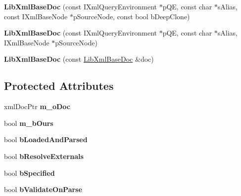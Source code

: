 \begin{DoxyCompactItemize}
\item 
\hypertarget{classgeneral__server_1_1LibXmlBaseDoc_a7a0b66f1564a53967b3620b5c8a22bfc}{{\bfseries \-Lib\-Xml\-Base\-Doc} (const \-I\-Xml\-Query\-Environment $\ast$p\-Q\-E, const char $\ast$s\-Alias, const \-I\-Xml\-Base\-Node $\ast$p\-Source\-Node, const bool b\-Deep\-Clone)}\label{classgeneral__server_1_1LibXmlBaseDoc_a7a0b66f1564a53967b3620b5c8a22bfc}

\item 
\hypertarget{classgeneral__server_1_1LibXmlBaseDoc_af5a822033de655d7ab04bdb86affcde9}{{\bfseries \-Lib\-Xml\-Base\-Doc} (const \-I\-Xml\-Query\-Environment $\ast$p\-Q\-E, const char $\ast$s\-Alias, \-I\-Xml\-Base\-Node $\ast$p\-Source\-Node)}\label{classgeneral__server_1_1LibXmlBaseDoc_af5a822033de655d7ab04bdb86affcde9}

\item 
\hypertarget{classgeneral__server_1_1LibXmlBaseDoc_a77c0d53cc2ae4f807591a61470c4d4c7}{{\bfseries \-Lib\-Xml\-Base\-Doc} (const \hyperlink{classgeneral__server_1_1LibXmlBaseDoc}{\-Lib\-Xml\-Base\-Doc} \&doc)}\label{classgeneral__server_1_1LibXmlBaseDoc_a77c0d53cc2ae4f807591a61470c4d4c7}

\end{DoxyCompactItemize}
\subsection*{\-Protected \-Attributes}
\begin{DoxyCompactItemize}
\item 
\hypertarget{classgeneral__server_1_1LibXmlBaseDoc_a2eafa7925bef59043e7a1022373a93da}{xml\-Doc\-Ptr {\bfseries m\-\_\-o\-Doc}}\label{classgeneral__server_1_1LibXmlBaseDoc_a2eafa7925bef59043e7a1022373a93da}

\item 
\hypertarget{classgeneral__server_1_1LibXmlBaseDoc_ad37961a7e05474336df7f6bdd02e4114}{bool {\bfseries m\-\_\-b\-Ours}}\label{classgeneral__server_1_1LibXmlBaseDoc_ad37961a7e05474336df7f6bdd02e4114}

\item 
\hypertarget{classgeneral__server_1_1LibXmlBaseDoc_ad9a64a817392bbb36723df3e92618722}{bool {\bfseries b\-Loaded\-And\-Parsed}}\label{classgeneral__server_1_1LibXmlBaseDoc_ad9a64a817392bbb36723df3e92618722}

\item 
\hypertarget{classgeneral__server_1_1LibXmlBaseDoc_a73a0fa1e3731c0963a1abbb1d36f236b}{bool {\bfseries b\-Resolve\-Externals}}\label{classgeneral__server_1_1LibXmlBaseDoc_a73a0fa1e3731c0963a1abbb1d36f236b}

\item 
\hypertarget{classgeneral__server_1_1LibXmlBaseDoc_ae5ec9cd5ee0db9a1bc04ebc5a69d8fb8}{bool {\bfseries b\-Specified}}\label{classgeneral__server_1_1LibXmlBaseDoc_ae5ec9cd5ee0db9a1bc04ebc5a69d8fb8}

\item 
\hypertarget{classgeneral__server_1_1LibXmlBaseDoc_ade219a64f745e8009257e4bd44c167e6}{bool {\bfseries b\-Validate\-On\-Parse}}\label{classgeneral__server_1_1LibXmlBaseDoc_ade219a64f745e8009257e4bd44c167e6}

\end{DoxyCompactItemize}
